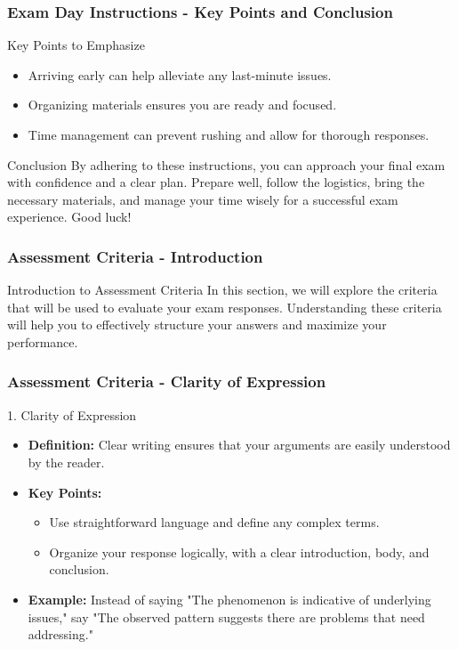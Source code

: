 \documentclass[aspectratio=169]{beamer}
\begin{document}
\begin{frame}[fragile]
    \frametitle{Exam Day Instructions - Key Points and Conclusion}
    \begin{block}{Key Points to Emphasize}
        \begin{itemize}
            \item Arriving early can help alleviate any last-minute issues.
            \item Organizing materials ensures you are ready and focused.
            \item Time management can prevent rushing and allow for thorough responses.
        \end{itemize}
    \end{block}
    \begin{block}{Conclusion}
        By adhering to these instructions, you can approach your final exam with confidence and a clear plan. Prepare well, follow the logistics, bring the necessary materials, and manage your time wisely for a successful exam experience. Good luck!
    \end{block}
\end{frame}

\begin{frame}[fragile]
    \frametitle{Assessment Criteria - Introduction}
    \begin{block}{Introduction to Assessment Criteria}
        In this section, we will explore the criteria that will be used to evaluate your exam responses. 
        Understanding these criteria will help you to effectively structure your answers and maximize your performance.
    \end{block}
\end{frame}

\begin{frame}[fragile]
    \frametitle{Assessment Criteria - Clarity of Expression}
    \begin{block}{1. Clarity of Expression}
        \begin{itemize}
            \item \textbf{Definition:} Clear writing ensures that your arguments are easily understood by the reader.
            \item \textbf{Key Points:}
                \begin{itemize}
                    \item Use straightforward language and define any complex terms.
                    \item Organize your response logically, with a clear introduction, body, and conclusion.
                \end{itemize}
            \item \textbf{Example:} Instead of saying "The phenomenon is indicative of underlying issues," say 
            "The observed pattern suggests there are problems that need addressing."
        \end{itemize}
    \end{block}
\end{frame}
\end{document}
